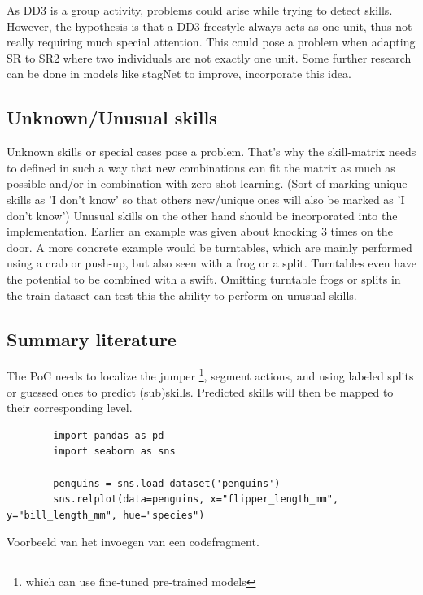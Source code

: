 As DD3 is a group activity, problems could arise while trying to detect skills. However, the hypothesis is that a DD3 freestyle always acts as one unit, thus not really requiring much special attention. This could pose a problem when adapting SR to SR2 where two individuals are not exactly one unit. Some further research can be done in models like stagNet \autocite{Qi_2020} to improve, incorporate this idea.

\subsection{Unknown/Unusual skills}
\label{subsec:literature-unknown-unusual-skills}

Unknown skills or special cases pose a problem. That’s why the skill-matrix needs to defined
in such a way that new combinations can fit the matrix as much as possible and/or in combination with zero-shot learning. (Sort of marking unique skills as ’I don’t know’ so that others new/unique ones will also be marked as ’I don’t know’) Unusual skills on the other hand should be incorporated into the implementation.
Earlier an example was given about knocking 3 times on the door. A more concrete example would be turntables, which are mainly performed using a crab or push-up, but also seen with a frog or a split.
Turntables even have the potential to be combined with a swift. Omitting turntable frogs or splits in the train dataset can test this the ability to perform on unusual skills.

\subsection{Summary literature}
\label{subsec:summary literature}

The PoC needs to localize the jumper \footnote{which can use fine-tuned pre-trained models}, segment actions, and using labeled splits or guessed ones to predict (sub)skills.
Predicted skills will then be mapped to their corresponding level.





\begin{listing}
    \begin{verbatim}
        import pandas as pd
        import seaborn as sns

        penguins = sns.load_dataset('penguins')
        sns.relplot(data=penguins, x="flipper_length_mm", y="bill_length_mm", hue="species")
    \end{verbatim}
    \caption[Voorbeeld codefragment]{Voorbeeld van het invoegen van een codefragment.}
\end{listing}
